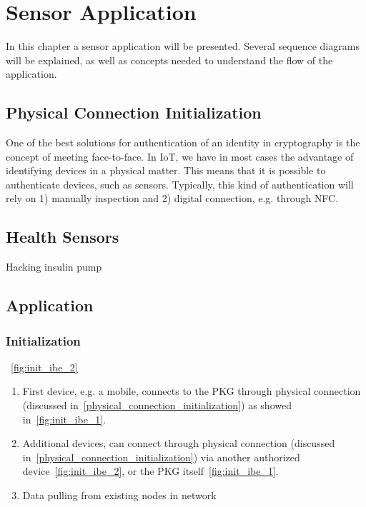 \chapter{Sensor Application}\label{sensor-application}
In this chapter a sensor application will be presented. 
Several sequence diagrams will be explained, as well as concepts needed to understand the flow of the application. 

\section{Physical Connection Initialization}\label{physical_connection_initialization}
One of the best solutions for authentication of an identity in cryptography is the concept of meeting face-to-face. 
In \gls{IoT}, we have in most cases the advantage of identifying devices in a physical matter. 
This means that it is possible to authenticate devices, such as sensors. 
Typically, this kind of authentication will rely on 1) manually inspection and 2) digital connection, e.g. through \gls{NFC}.

\section{Health Sensors}
Hacking insulin pump~\cite{radcliffe2011hacking}

\section{Application}


\subsection{Initialization}
~\autoref{fig:init_ibe_2}

\begin{enumerate}
  \item First device, e.g. a mobile, connects to the \gls{PKG} through physical connection (discussed in~\autoref{physical_connection_initialization}) as showed in~\autoref{fig:init_ibe_1}.
  \item Additional devices, can connect through physical connection (discussed in~\autoref{physical_connection_initialization}) via another authorized device~\autoref{fig:init_ibe_2}, or the \gls{PKG} itself~\autoref{fig:init_ibe_1}. 
  \item Data pulling from existing nodes in network
\end{enumerate}

